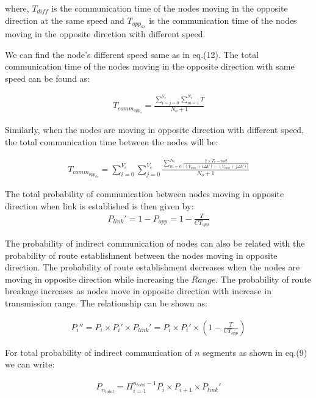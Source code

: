 \documentclass[journal]{IEEEtran}
\begin{document}
where, $ T_{diff} $ is the communication time of the nodes moving in the opposite direction at the same speed and $ T_{opp_{ds}}$ is the communication time of the nodes moving in the opposite direction with different speed.

We can find the node's different speed same as in eq.(12). The total communication time of the nodes moving in the opposite direction with same speed can be found as:

\begin{eqnarray}
T_{comm_{opp_{s}}}=\frac{\sum_{i=j=0}^{V_{c}}\sum_{m=1}^{N_{o}}T}{N_{o}+1}
\end{eqnarray}

Similarly, when the nodes are moving in opposite direction with different speed, the total communication time between the nodes will be:

\tiny
\begin{eqnarray}
T_{comm_{opp_{ds}}}=\sum_{i=0}^{V_{c}}\sum_{j=0}^{V_{c}}\frac{\sum_{m=0}^{N_{o}}\frac{2\times T_{r}-md}{|{(V_{min}+i\Delta{V})-(V_{min}+j\Delta{V})}|}}{N_{o}+1}
\end{eqnarray}
\normalsize

The total probability of communication between nodes moving in opposite direction when link is established is then given by:
\begin{eqnarray}
P_{link}'=1-P_{opp}=1-\frac{T}{CT_{opp}}
\end{eqnarray}

The probability of indirect communication of nodes can also be related with the probability of route establishment between the nodes moving in opposite direction. The probability of route establishment decreases when the nodes are moving in opposite direction while increasing the $Range$. The probability of route breakage increases as nodes move in opposite direction with increase in transmission range.
The relationship can be shown as:

\begin{eqnarray}
P_{i}''=P_{i}\times P_{i}' \times P_{link}'=P_{i}\times P_{i}' \times (1-\frac{T}{CT_{opp}})
\end{eqnarray}


For total probability of indirect communication of $n$ segments as shown in eq.(9) we can write:

\begin{eqnarray}
P_{n_{total}}=\Pi_{i=1}^{n_{total}-1}P_{i}\times P_{i+1}\times P_{link}'
\end{eqnarray}
\end{document}
